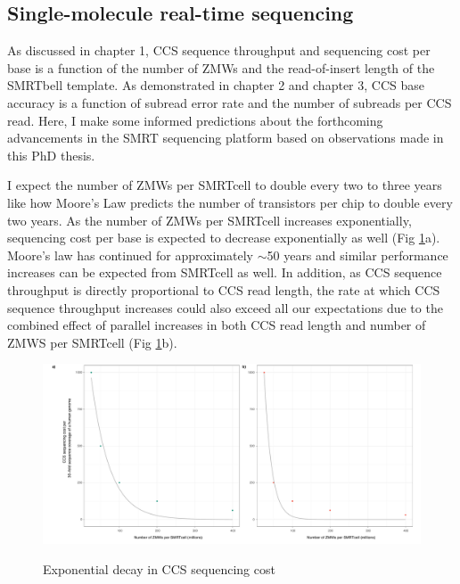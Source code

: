 \subsection{Single-molecule real-time sequencing}

As discussed in chapter 1, CCS sequence throughput and sequencing cost per base is a function of the number of ZMWs and the read-of-insert length of the SMRTbell template. As demonstrated in chapter 2 and chapter 3, CCS base accuracy is a function of subread error rate and the number of subreads per CCS read. Here, I make some informed predictions about the forthcoming advancements in the SMRT sequencing platform based on observations made in this PhD thesis.

I expect the number of ZMWs per SMRTcell to double every two to three years like how Moore’s Law predicts the number of transistors per chip to double every two years. As the number of ZMWs per SMRTcell increases exponentially, sequencing cost per base is expected to decrease exponentially as well (Fig \ref{figure:ccs_sequence_throughput}a). Moore’s law has continued for approximately $\sim$50 years and similar performance increases can be expected from SMRTcell as well. In addition, as CCS sequence throughput is directly proportional to CCS read length, the rate at which CCS sequence throughput increases could also exceed all our expectations due to the combined effect of parallel increases in both CCS read length and number of ZMWS per SMRTcell (Fig \ref{figure:ccs_sequence_throughput}b). 

\begin{figure}[h]
\caption{Exponential decay in CCS sequencing cost}\label{figure:ccs_sequence_throughput}
\begin{centering}
\includegraphics[width=\textwidth]{exponential_decay_in_ccs_sequencing_cost.pdf} \\ \smallskip
\end{centering}
\end{figure}

